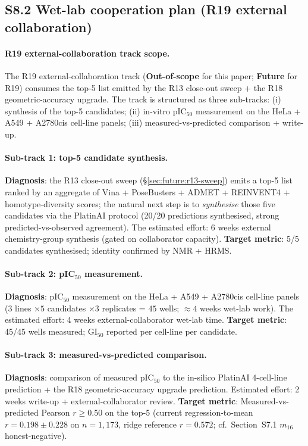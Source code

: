\subsection*{S8.2 Wet-lab cooperation plan (R19 external collaboration)}
\label{supp:s8-wetlab}

\paragraph{R19 external-collaboration track scope.}
The R19 external-collaboration track (\textbf{Out-of-scope}
for this paper; \textbf{Future} for R19) consumes the top-5
list emitted by the R13 close-out sweep + the R18
geometric-accuracy upgrade.  The track is structured as
three sub-tracks: (i) synthesis of the top-5 candidates; (ii)
in-vitro pIC$_{50}$ measurement on the HeLa + A549 + A2780cis
cell-line panels; (iii) measured-vs-predicted comparison +
write-up.

\paragraph{Sub-track 1: top-5 candidate synthesis.}
\textbf{Diagnosis}: the R13 close-out sweep
(\S\ref{sec:future:r13-sweep}) emits a top-5 list ranked by
an aggregate of Vina + PoseBusters + ADMET + REINVENT4 +
homotype-diversity scores; the natural next step is to
\emph{synthesise} those five candidates via the PlatinAI
\citep{rusanov2025platinai} protocol (20/20 predictions
synthesised, strong predicted-vs-observed agreement).  The
estimated effort: 6 weeks external chemistry-group synthesis
(gated on collaborator capacity).
\textbf{Target metric}: 5/5 candidates synthesised; identity
confirmed by NMR + HRMS.

\paragraph{Sub-track 2: pIC$_{50}$ measurement.}
\textbf{Diagnosis}: pIC$_{50}$ measurement on the HeLa +
A549 + A2780cis cell-line panels (3 lines $\times 5$
candidates $\times 3$ replicates = $45$ wells; $\approx 4$
weeks wet-lab work).  The estimated effort: 4 weeks
external-collaborator wet-lab time.  \textbf{Target metric}:
45/45 wells measured; $\mathrm{GI}_{50}$ reported per cell-line
per candidate.

\paragraph{Sub-track 3: measured-vs-predicted comparison.}
\textbf{Diagnosis}: comparison of measured pIC$_{50}$ to the
in-silico PlatinAI 4-cell-line prediction +
the R18 geometric-accuracy upgrade prediction.  Estimated
effort: 2 weeks write-up + external-collaborator review.
\textbf{Target metric}: Measured-vs-predicted Pearson
$r \geq 0.50$ on the top-5 (current regression-to-mean
$r = 0.198 \pm 0.228$ on $n = 1{,}173$, ridge reference
$r = 0.572$; cf.\ Section~S7.1 $m_{16}$ honest-negative).

